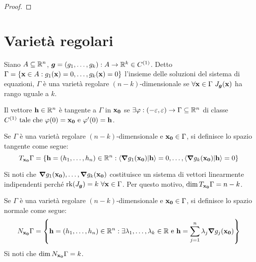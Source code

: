\begin{proof}
    
\end{proof}

\section{Varietà regolari}

\begin{definition}
    Siano $A \subseteq \mathbb{R}^n$, $\bm g=(g_1,\dots,g_k):A\to\mathbb{R}^k \in C^{(1)}$. Detto $\Gamma =\{\vb{x}\in A : g_1(\vb{x})=0,\dots,g_k(\vb{x})=0\}$ l'insieme delle soluzioni del sistema di equazioni, $\Gamma$ è una varietà regolare $(n-k)$-dimensionale se $\forall \vb{x} \in \Gamma \ J_{\bm g}(\vb{x})$ ha rango uguale a $k$.
\end{definition}

\begin{definition}
    Il vettore $\vb{h} \in \mathbb{R}^n$ è tangente a $\Gamma$ in $\vb{x_0}$ se $\exists \varphi: (-\varepsilon, \varepsilon) \to \Gamma \subseteq \mathbb{R}^n$ di classe $C^{(1)} \text{ tale che } \varphi (0) = \vb{x_0} \text{ e } \varphi ' (0) = \vb{h}$.
\end{definition}

\begin{definition}
    Se $\Gamma$ è una varietà regolare $(n-k)$-dimensionale e $\vb{x_0} \in \Gamma$, si definisce lo spazio tangente come segue:
    \begin{equation*}
        T_{\vb{x_0}}\Gamma = \{ \vb{h}=(h_1,\dots,h_n) \in \R^n : \innerproduct{\grad g_1(\vb{x_0)}}{\vb{h}}=0,\dots,\innerproduct{\grad g_k(\vb{x_0)}}{\vb{h}}=0 \}
    \end{equation*}
\end{definition}

\begin{remark}
    Si noti che $\grad g_1(\vb{x_0}),\dots,\grad g_k (\vb{x_0})$ costituisce un sistema di vettori linearmente indipendenti perché $\operatorname{rk}(J_{\bm g})=k \ \forall \vb{x} \in \Gamma$. Per questo motivo, $\dim T_{\vb{x_0}}\Gamma= n-k$.
\end{remark}

\begin{definition}
    Se $\Gamma$ è una varietà regolare $(n-k)$-dimensionale e $\vb{x_0} \in \Gamma$, si definisce lo spazio normale come segue:
    \begin{equation*}
        N_{\vb{x_0}}\Gamma = \left\{ \vb{h}=(h_1,\dots,h_n) \in \mathbb{R}^n : \exists \lambda_1, \dots, \lambda_k \in \mathbb{R} \text{ e } \vb{h}=\sum_{j=1}^n \lambda_j \grad g_j(\vb{x_0}) \right\}
    \end{equation*}
    Si noti che $\dim N_{\vb{x_0}}\Gamma = k$.
\end{definition}


